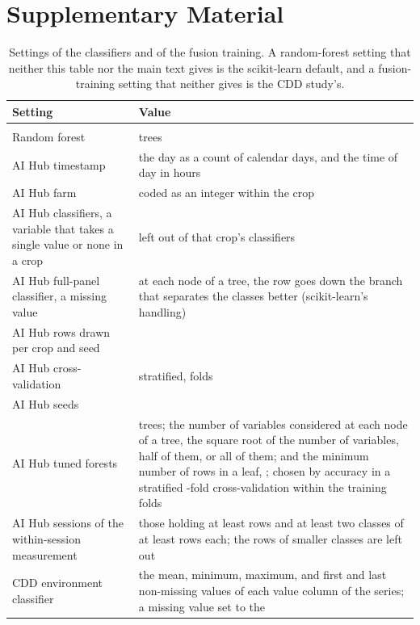 \documentclass[11pt]{article}
\begin{document}
\section*{Supplementary Material}

\begin{table}[H]
\centering
\scriptsize
\caption{Settings of the classifiers and of the fusion training. A random-forest
setting that neither this table nor the main text gives is the scikit-learn
default, and a fusion-training setting that neither gives is the CDD study's.}
\label{tab:settings}
\begin{tabular}{>{\raggedright\arraybackslash}p{}>{\raggedright\arraybackslash}p{}}
\toprule
Setting & Value \\
\midrule
\multicolumn{2}{l}{\emph{Timestamp baseline and CDD re-analysis}} \\
Random forest & \forestTrees{} trees \\
AI Hub timestamp & the day as a count of calendar days, and the time of day in
hours \\
AI Hub farm & coded as an integer within the crop \\
AI Hub classifiers, a variable that takes a single value or none in a crop & left
out of that crop's classifiers \\
AI Hub full-panel classifier, a missing value & at each node of a tree, the row goes
down the branch that separates the classes better (scikit-learn's handling) \\
AI Hub rows drawn per crop and seed & \timestampSampleRows{} \\
AI Hub cross-validation & stratified, \timestampFolds{} folds \\
AI Hub seeds & \numSeeds{} \\
AI Hub tuned forests & \tunedTrees{} trees; the number of variables considered at each
node of a tree, the square root of the number of variables, half of them, or all of them; and
the minimum number of rows in a leaf, \tunedLeafSizes{}; chosen by accuracy in a
stratified \tunedInnerFolds{}-fold cross-validation within the training folds \\
AI Hub sessions of the within-session measurement & those holding at least
\sessionMinRows{} rows and at least two classes of at least
\sessionMinClassRows{} rows each; the rows of smaller classes are left out \\
CDD environment classifier & the mean, minimum, maximum, and first and last
non-missing values of each value column of the series; a missing value set to the

\end{tabular}
\end{table}
\end{document}
